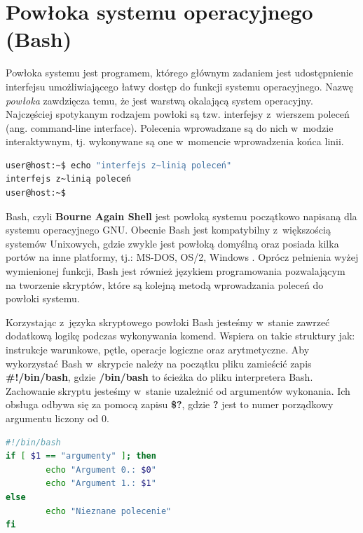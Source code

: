 \section{Powłoka systemu operacyjnego (Bash)}
Powłoka systemu jest programem, którego głównym zadaniem jest udostępnienie interfejsu umożliwiającego łatwy dostęp do funkcji systemu operacyjnego. Nazwę \textit{powłoka} zawdzięcza temu, że jest warstwą okalającą system operacyjny. Najczęściej spotykanym rodzajem powłoki są tzw. interfejsy z~wierszem poleceń (ang. command-line interface). Polecenia wprowadzane są do nich w~modzie interaktywnym, tj. wykonywane są one w~momencie wprowadzenia końca linii.

\begin{lstlisting}[language=bash,language=Cmd,caption={Komenda wypisująca tekst na standardowe wyjście wykonana z~linii poleceń}]
user@host:~$ echo "interfejs z~linią poleceń"
interfejs z~linią poleceń
user@host:~$
\end{lstlisting}

Bash, czyli \textbf{Bourne Again Shell} jest powłoką systemu początkowo napisaną dla systemu operacyjnego GNU. Obecnie Bash jest kompatybilny z~większością systemów Unixowych, gdzie zwykle jest powłoką domyślną oraz posiada kilka portów na inne platformy, tj.: MS-DOS, OS/2, Windows \cite{BashMan}. Oprócz pełnienia wyżej wymienionej funkcji, Bash jest również językiem programowania pozwalającym na tworzenie skryptów, które są kolejną metodą wprowadzania poleceń do powłoki systemu.\par
Korzystając z~języka skryptowego powłoki Bash jesteśmy w~stanie zawrzeć dodatkową logikę podczas wykonywania komend. Wspiera on takie struktury jak: instrukcje warunkowe, pętle, operacje logiczne oraz arytmetyczne. Aby wykorzystać Bash w~skrypcie należy na początku pliku zamieścić zapis \textbf{\#!/bin/bash}, gdzie \textbf{/bin/bash} to ścieżka do pliku interpretera Bash. Zachowanie skryptu jesteśmy w~stanie uzależnić od argumentów wykonania. Ich obsługa odbywa się za pomocą zapisu \textbf{\$?}, gdzie \textbf{?} jest to numer porządkowy argumentu liczony od 0.

\begin{lstlisting}[label={lst:prostySkrypt},language=bash,caption={Skrypt wykorzystujący argumenty wejściowe, instrukcję warunkową oraz polecenie echo}]
#!/bin/bash
if [ $1 == "argumenty" ]; then
        echo "Argument 0.: $0"
        echo "Argument 1.: $1"
else
        echo "Nieznane polecenie"
fi
\end{lstlisting}

